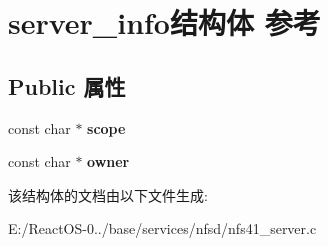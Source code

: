 \hypertarget{structserver__info}{}\section{server\+\_\+info结构体 参考}
\label{structserver__info}
\subsection*{Public 属性}
\begin{DoxyCompactItemize}
\item 
\mbox{\label{structserver__info_a557bca93e910e86ef256082acdf31149}} 
const char $\ast$ {\bfseries scope}
\item 
\mbox{\label{structserver__info_a28a15247f32b084b7aec773fa8e3723e}} 
const char $\ast$ {\bfseries owner}
\end{DoxyCompactItemize}


该结构体的文档由以下文件生成\+:\begin{DoxyCompactItemize}
\item 
E\+:/\+React\+O\+S-\/0../base/services/nfsd/nfs41\+\_\+server.\+c\end{DoxyCompactItemize}
